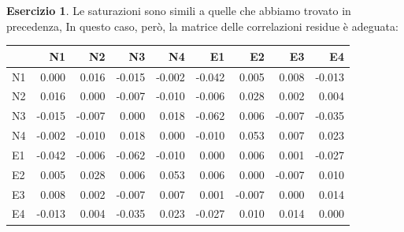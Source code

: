 \documentclass[
  11pt,
]{krantz}
\makeatletter
\newenvironment{Shaded}{\begin{snugshade}}{\end{snugshade}}
\newcommand{\AttributeTok}[1]{\textcolor[rgb]{0.61,0.61,0.61}{#1}}
\newcommand{\ConstantTok}[1]{\textcolor[rgb]{0,0,0}{#1}}
\newcommand{\DecValTok}[1]{\textcolor[rgb]{0.06,0.06,0.06}{#1}}
\newcommand{\FunctionTok}[1]{\textcolor[rgb]{0,0,0}{#1}}
\newcommand{\NormalTok}[1]{#1}
\newcommand{\OtherTok}[1]{\textcolor[rgb]{0.37,0.37,0.37}{#1}}
\newcommand{\SpecialCharTok}[1]{\textcolor[rgb]{0,0,0}{#1}}
\newcommand{\StringTok}[1]{\textcolor[rgb]{0.5,0.5,0.5}{#1}}
\newenvironment{kframe}{%
\medskip{}
\setlength{\fboxsep}{.8em}
 \def\at@end@of@kframe{}%
 \ifinner\ifhmode%
  \def\at@end@of@kframe{\end{minipage}}%
  \begin{minipage}{\columnwidth}%
 \fi\fi%
 \def\FrameCommand##1{\hskip\@totalleftmargin \hskip-\fboxsep
 \colorbox{shadecolor}{##1}\hskip-\fboxsep
     \hskip-\linewidth \hskip-\@totalleftmargin \hskip\columnwidth}%
 \MakeFramed {\advance\hsize-\width
   \@totalleftmargin\z@ \linewidth\hsize
   \@setminipage}}%
 {\par\unskip\endMakeFramed%
 \at@end@of@kframe}
\renewenvironment{Shaded}{\begin{kframe}}{\end{kframe}}
\theoremstyle{definition}
\theoremstyle{definition}
\theoremstyle{definition}
\newtheorem{exercise}{Esercizio}[chapter]
\theoremstyle{definition}
\theoremstyle{remark}
\makeatother
\begin{document}
\begin{exercise}
Le saturazioni sono simili a quelle che abbiamo trovato in precedenza, In questo caso, però, la matrice delle correlazioni residue è adeguata:

\begin{Shaded}
\end{Shaded}

\begin{longtable}[]{@{}lrrrrrrrr@{}}
\toprule
& N1 & N2 & N3 & N4 & E1 & E2 & E3 & E4 \\
\midrule
\endhead
N1 & 0.000 & 0.016 & -0.015 & -0.002 & -0.042 & 0.005 & 0.008 & -0.013 \\
N2 & 0.016 & 0.000 & -0.007 & -0.010 & -0.006 & 0.028 & 0.002 & 0.004 \\
N3 & -0.015 & -0.007 & 0.000 & 0.018 & -0.062 & 0.006 & -0.007 & -0.035 \\
N4 & -0.002 & -0.010 & 0.018 & 0.000 & -0.010 & 0.053 & 0.007 & 0.023 \\
E1 & -0.042 & -0.006 & -0.062 & -0.010 & 0.000 & 0.006 & 0.001 & -0.027 \\
E2 & 0.005 & 0.028 & 0.006 & 0.053 & 0.006 & 0.000 & -0.007 & 0.010 \\
E3 & 0.008 & 0.002 & -0.007 & 0.007 & 0.001 & -0.007 & 0.000 & 0.014 \\
E4 & -0.013 & 0.004 & -0.035 & 0.023 & -0.027 & 0.010 & 0.014 & 0.000 \\
\bottomrule
\end{longtable}

\end{exercise}
\end{document}
